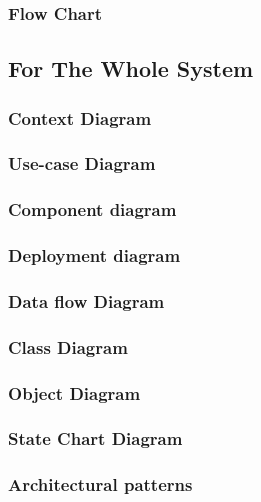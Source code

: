 \documentclass{article}
\begin{document}
		\newpage\subsubsection{Flow Chart}

	\newpage\subsection{For The Whole System}
	\subsubsection{Context Diagram}	
	\subsubsection{Use-case Diagram}
	\subsubsection{Component diagram}
	\subsubsection{Deployment diagram}
	\subsubsection{Data flow Diagram}		
	\subsubsection{Class Diagram}
	\subsubsection{Object Diagram}		
	\subsubsection{State Chart Diagram}
	\subsubsection{Architectural patterns}


	\newpage
	
	
\end{document}
